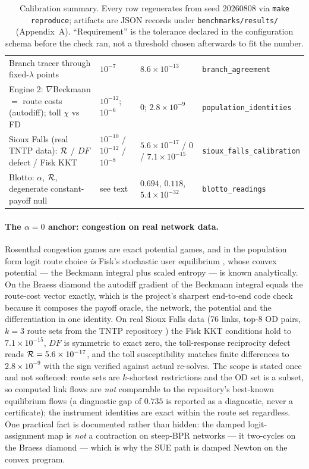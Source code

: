 \begin{table}[t]
\begin{tabular}{@{}>{\raggedright\arraybackslash}p{5.2cm}>{\raggedright\arraybackslash}p{1.8cm}>{\raggedright\arraybackslash}p{3.2cm}>{\raggedright\arraybackslash}p{4.1cm}@{}}
Branch tracer through fixed-$\lambda$ points & $10^{-7}$ & $8.6\times10^{-13}$ & \texttt{branch\_agreement} \\
Engine 2: $\nabla$Beckmann $=$ route costs (autodiff); toll $\chi$ vs FD & $10^{-12}$; $10^{-6}$ & $0$; $2.8\times10^{-9}$ & \texttt{population\_identities} \\
Sioux Falls (real TNTP data): $\mathcal{R}$ / $DF$ defect / Fisk KKT & $10^{-10}$ / $10^{-12}$ / $10^{-8}$ & $5.6\times10^{-17}$ / $0$ / $7.1\times10^{-15}$ & \texttt{sioux\_falls\_calibration} \\
Blotto: $\alpha$, $\mathcal{R}$, degenerate constant-payoff null & see text & $0.694$, $0.118$, $5.4\times10^{-32}$ & \texttt{blotto\_readings} \\
\bottomrule
\end{tabular}
\caption{Calibration summary. Every row regenerates from seed 20260808 via
\texttt{make reproduce}; artifacts are JSON records under
\texttt{benchmarks/results/} (Appendix~A). ``Requirement'' is the tolerance
declared in the configuration schema before the check ran, not a threshold
chosen afterwards to fit the number.}
\label{tab:calib}
\end{table}

\paragraph{The $\alpha=0$ anchor: congestion on real network data.} Rosenthal
congestion games \citep{rosenthal1973} are exact potential games, and in the
population form logit route choice \emph{is} Fisk's stochastic user equilibrium
\citep{fisk1980}, whose convex potential --- the Beckmann integral plus scaled
entropy --- is known analytically. On the Braess diamond the autodiff gradient
of the Beckmann integral equals the route-cost vector exactly, which is the
project's sharpest end-to-end code check because it composes the payoff oracle,
the network, the potential and the differentiation in one identity. On real
Sioux Falls data (76 links, top-8 OD pairs, $k{=}3$ route sets from the TNTP
repository \citep{tntp}) the Fisk KKT conditions hold to $7.1\times10^{-15}$,
$DF$ is symmetric to exact zero, the toll-response reciprocity defect reads
$\mathcal{R}=5.6\times10^{-17}$, and the toll susceptibility matches finite differences to
$2.8\times10^{-9}$ with the sign verified against actual re-solves. The scope is
stated once and not softened: route sets are $k$-shortest restrictions and the OD
set is a subset, so computed link flows are \emph{not} comparable to the
repository's best-known equilibrium flows (a diagnostic gap of $0.735$ is
reported as a diagnostic, never a certificate); the instrument identities are
exact within the route set regardless. One practical fact is documented rather
than hidden: the damped logit-assignment map is \emph{not} a contraction on
steep-BPR networks --- it two-cycles on the Braess diamond --- which is why the
SUE path is damped Newton on the convex program.

